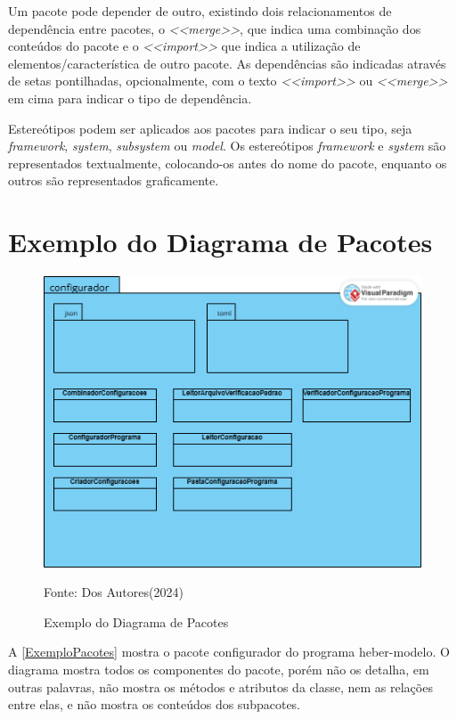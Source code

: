 \documentclass[12pt,openright,oneside,a4paper,
	chapter=TITLE,
	section=TITLE,
	english,brazil]{abntex2}
\begin{document}
Um pacote pode depender de outro, existindo dois relacionamentos de dependência entre pacotes, o \textit{<<merge>>}, que indica uma combinação dos conteúdos do pacote  e o \textit{<<import>>} que indica a utilização de elementos/característica de outro pacote.  As dependências são indicadas através de setas pontilhadas, opcionalmente, com o texto \textit{<<import>>} ou \textit{<<merge>>} em cima para indicar o tipo de dependência.

Estereótipos podem ser aplicados aos pacotes para indicar o seu tipo, seja \textit{framework}, \textit{system}, \textit{subsystem} ou \textit{model}. Os estereótipos \textit{framework} e \textit{system} são representados textualmente, colocando-os antes do nome do pacote, enquanto os outros são representados graficamente.

\section{Exemplo do Diagrama de Pacotes}

\begin{figure}[!htp]
	\caption{Exemplo do Diagrama de Pacotes}
	\centering
	\includegraphics[scale=0.5]{img/ExemploDiagramaPacotes.png}
	\\

	\label{ExemploPacotes}
	\footnotesize\raggedright Fonte: Dos Autores(2024)
\end{figure}

A \autoref{ExemploPacotes} mostra o pacote configurador do programa heber-modelo. O diagrama mostra todos os componentes do pacote, porém não os detalha, em outras palavras, não mostra os métodos e atributos da classe, nem as relações entre elas, e não mostra os conteúdos dos subpacotes.
\end{document}
